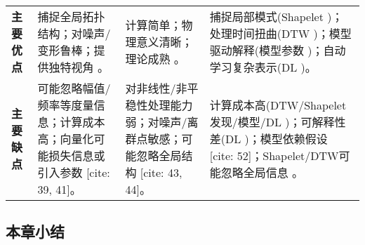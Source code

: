 \begin{table}[htbp]
\begin{tabular}{>{\raggedright}p{} >{\raggedright}p{} >{\raggedright}p{} >{\raggedright\arraybackslash}p{}}
        \addlinespace
        \textbf{主要优点} &
        捕捉全局拓扑结构；对噪声/变形鲁棒；提供独特视角 。 &
        计算简单；物理意义清晰；理论成熟 。 &
        捕捉局部模式(Shapelet )；处理时间扭曲(DTW )；模型驱动解释(模型参数 )；自动学习复杂表示(DL )。 \\
        \addlinespace
        \textbf{主要缺点} &
        可能忽略幅值/频率等度量信息；计算成本高；向量化可能损失信息或引入参数 [cite: 39, 41]。 &
        对非线性/非平稳性处理能力弱；对噪声/离群点敏感；可能忽略全局结构 [cite: 43, 44]。 &
        计算成本高(DTW/Shapelet发现/模型/DL )；可解释性差(DL )；模型依赖假设 [cite: 52]；Shapelet/DTW可能忽略全局信息 。 \\
        \bottomrule
    \end{tabular}
\end{table}
 \subsection{本章小结}
        \label{sec:ch4_summary}
